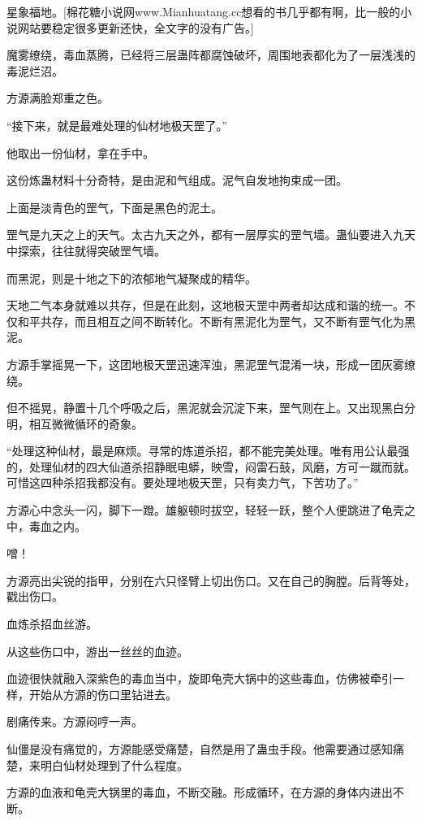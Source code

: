 
\begin{this_body}

星象福地。[棉花糖小说网www.Mianhuatang.cc想看的书几乎都有啊，比一般的小说网站要稳定很多更新还快，全文字的没有广告。]

魔雾缭绕，毒血蒸腾，已经将三层蛊阵都腐蚀破坏，周围地表都化为了一层浅浅的毒泥烂沼。

方源满脸郑重之色。

“接下来，就是最难处理的仙材地极天罡了。”

他取出一份仙材，拿在手中。

这份炼蛊材料十分奇特，是由泥和气组成。泥气自发地拘束成一团。

上面是淡青色的罡气，下面是黑色的泥土。

罡气是九天之上的天气。太古九天之外，都有一层厚实的罡气墙。蛊仙要进入九天中探索，往往就得突破罡气墙。

而黑泥，则是十地之下的浓郁地气凝聚成的精华。

天地二气本身就难以共存，但是在此刻，这地极天罡中两者却达成和谐的统一。不仅和平共存，而且相互之间不断转化。不断有黑泥化为罡气，又不断有罡气化为黑泥。

方源手掌摇晃一下，这团地极天罡迅速浑浊，黑泥罡气混淆一块，形成一团灰雾缭绕。

但不摇晃，静置十几个呼吸之后，黑泥就会沉淀下来，罡气则在上。又出现黑白分明，相互微微循环的奇象。

“处理这种仙材，最是麻烦。寻常的炼道杀招，都不能完美处理。唯有用公认最强的，处理仙材的四大仙道杀招静眠电蟒，映雪，闷雷石鼓，风磨，方可一蹴而就。可惜这四种杀招我都没有。要处理地极天罡，只有卖力气，下苦功了。”

方源心中念头一闪，脚下一蹬。雄躯顿时拔空，轻轻一跃，整个人便跳进了龟壳之中，毒血之内。

噌！

方源亮出尖锐的指甲，分别在六只怪臂上切出伤口。又在自己的胸膛。后背等处，戳出伤口。

血炼杀招血丝游。

从这些伤口中，游出一丝丝的血迹。

血迹很快就融入深紫色的毒血当中，旋即龟壳大锅中的这些毒血，仿佛被牵引一样，开始从方源的伤口里钻进去。

剧痛传来。方源闷哼一声。

仙僵是没有痛觉的，方源能感受痛楚，自然是用了蛊虫手段。他需要通过感知痛楚，来明白仙材处理到了什么程度。

方源的血液和龟壳大锅里的毒血，不断交融。形成循环，在方源的身体内进出不断。


\end{this_body}
